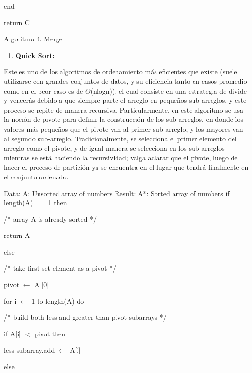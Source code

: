 \documentclass{article} %
\begin{document}
\noindent end

\noindent return C

\noindent Algoritmo 4: Merge

\noindent 

\noindent \textbf{}

\begin{enumerate}
\item \textbf{ Quick Sort:}
\end{enumerate}

\noindent \textbf{}

\noindent Este es uno de los algoritmos de ordenamiento m\'{a}s eficientes que existe (suele utilizarse con grandes conjuntos de datos, y su eficiencia tanto en casos promedio como en el peor caso es de $\Theta$(nlogn)), el cual consiste en una estrategia de divide y vencer\'{a}s debido a que siempre parte el arreglo en peque\~{n}os sub-arreglos, y este proceso se repite de manera recursiva.   Particularmente, en este algoritmo se usa la noci\'{o}n de pivote para definir la construcci\'{o}n de los sub-arreglos, en donde los valores m\'{a}s peque\~{n}os que el pivote van al primer sub-arreglo, y los mayores van al segundo sub-arreglo.   Tradicionalmente, se selecciona el primer elemento del arreglo como el pivote, y de igual manera se selecciona en los sub-arreglos mientras se est\'{a} haciendo la recursividad; valga aclarar que el pivote, luego de hacer el proceso de partici\'{o}n ya se encuentra en el lugar que tendr\'{a} finalmente en el conjunto ordenado.

\noindent \textbf{}

\noindent Data: A: Unsorted array of numbers Result:  A*: Sorted array of numbers if length(A) == 1 then

\noindent /* array A is already sorted */

\noindent return A

\noindent else

\noindent /* take first set element as a pivot */

\noindent pivot $\mathrm{\leftarrow}$ A [0]

\noindent for i $\mathrm{\leftarrow}$ 1 to length(A) do

\noindent /* build both less and greater than pivot subarrays */

\noindent if A[i] $\mathrm{<}$ pivot then

\noindent less subarray.add $\mathrm{\leftarrow}$ A[i]

\noindent else
\end{document}

